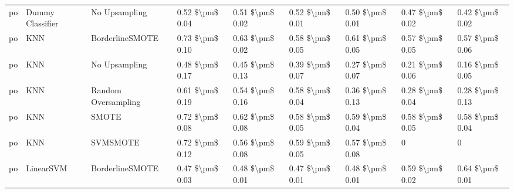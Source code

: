 \begin{tabular}{lllllllll}
      po &                Dummy Classifier &                 No Upsampling &     0.52 \$\textbackslash pm\$ 0.04 &           0.51 \$\textbackslash pm\$ 0.02 &       0.52 \$\textbackslash pm\$ 0.01 &        0.50 \$\textbackslash pm\$ 0.01 &                         0.47 \$\textbackslash pm\$ 0.02 &     0.42 \$\textbackslash pm\$ 0.02 \\
      po &                             KNN &               BorderlineSMOTE &     0.73 \$\textbackslash pm\$ 0.10 &           0.63 \$\textbackslash pm\$ 0.02 &       0.58 \$\textbackslash pm\$ 0.05 &        0.61 \$\textbackslash pm\$ 0.05 &                         0.57 \$\textbackslash pm\$ 0.05 &     0.57 \$\textbackslash pm\$ 0.06 \\
      po &                             KNN &                 No Upsampling &     0.48 \$\textbackslash pm\$ 0.17 &           0.45 \$\textbackslash pm\$ 0.13 &       0.39 \$\textbackslash pm\$ 0.07 &        0.27 \$\textbackslash pm\$ 0.07 &                         0.21 \$\textbackslash pm\$ 0.06 &     0.16 \$\textbackslash pm\$ 0.05 \\
      po &                             KNN &           Random Oversampling &     0.61 \$\textbackslash pm\$ 0.19 &           0.54 \$\textbackslash pm\$ 0.16 &       0.58 \$\textbackslash pm\$ 0.04 &        0.36 \$\textbackslash pm\$ 0.13 &                         0.28 \$\textbackslash pm\$ 0.04 &     0.28 \$\textbackslash pm\$ 0.13 \\
      po &                             KNN &                         SMOTE &     0.72 \$\textbackslash pm\$ 0.08 &           0.62 \$\textbackslash pm\$ 0.08 &       0.58 \$\textbackslash pm\$ 0.05 &        0.59 \$\textbackslash pm\$ 0.04 &                         0.58 \$\textbackslash pm\$ 0.05 &     0.58 \$\textbackslash pm\$ 0.04 \\
      po &                             KNN &                      SVMSMOTE &     0.72 \$\textbackslash pm\$ 0.12 &           0.56 \$\textbackslash pm\$ 0.08 &       0.59 \$\textbackslash pm\$ 0.05 &        0.57 \$\textbackslash pm\$ 0.08 &                                       0 &                   0 \\
      po &                       LinearSVM &               BorderlineSMOTE &     0.47 \$\textbackslash pm\$ 0.03 &           0.48 \$\textbackslash pm\$ 0.01 &       0.47 \$\textbackslash pm\$ 0.01 &        0.48 \$\textbackslash pm\$ 0.01 &                         0.59 \$\textbackslash pm\$ 0.02 &     0.64 \$\textbackslash pm\$ 0.01 \\

\end{tabular}
